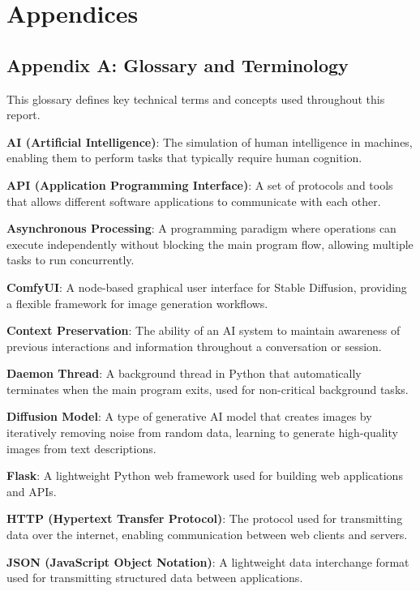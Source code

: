 \documentclass[12pt,a4paper]{article}
\begin{document}
    \section*{Appendices}

    \subsection*{Appendix A: Glossary and Terminology}

    This glossary defines key technical terms and concepts used throughout this report.

    \textbf{AI (Artificial Intelligence)}: The simulation of human intelligence in machines, enabling them to perform tasks that typically require human cognition.

    \textbf{API (Application Programming Interface)}: A set of protocols and tools that allows different software applications to communicate with each other.

    \textbf{Asynchronous Processing}: A programming paradigm where operations can execute independently without blocking the main program flow, allowing multiple tasks to run concurrently.

    \textbf{ComfyUI}: A node-based graphical user interface for Stable Diffusion, providing a flexible framework for image generation workflows.

    \textbf{Context Preservation}: The ability of an AI system to maintain awareness of previous interactions and information throughout a conversation or session.

    \textbf{Daemon Thread}: A background thread in Python that automatically terminates when the main program exits, used for non-critical background tasks.

    \textbf{Diffusion Model}: A type of generative AI model that creates images by iteratively removing noise from random data, learning to generate high-quality images from text descriptions.

    \textbf{Flask}: A lightweight Python web framework used for building web applications and APIs.

    \textbf{HTTP (Hypertext Transfer Protocol)}: The protocol used for transmitting data over the internet, enabling communication between web clients and servers.

    \textbf{JSON (JavaScript Object Notation)}: A lightweight data interchange format used for transmitting structured data between applications.
\end{document}
